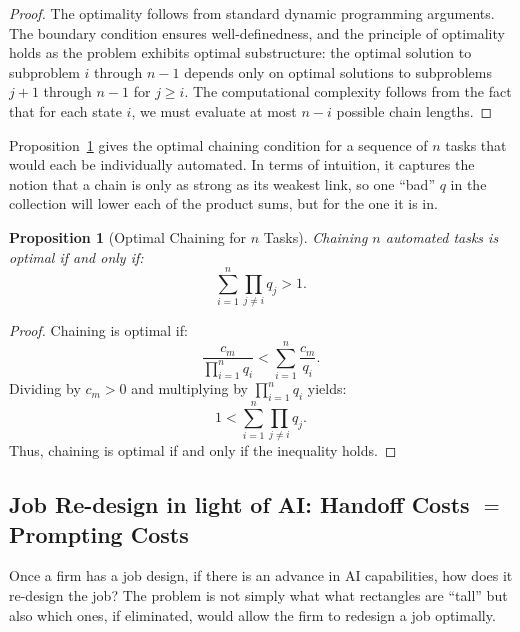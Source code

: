 \documentclass{article}
\newtheorem{proposition}[theorem]{Proposition}
\begin{document}
\begin{proof}
The optimality follows from standard dynamic programming arguments. The boundary condition ensures well-definedness, and the principle of optimality holds as the problem exhibits optimal substructure: the optimal solution to subproblem $i$ through $n-1$ depends only on optimal solutions to subproblems $j+1$ through $n-1$ for $j \geq i$. The computational complexity follows from the fact that for each state $i$, we must evaluate at most $n-i$ possible chain lengths.
\end{proof}

Proposition~\ref{prop:optimal_chaining} gives the optimal chaining condition for a sequence of $n$ tasks that would each be individually automated.
In terms of intuition, it captures the notion that a chain is only as strong as its weakest link, so one ``bad'' $q$ in the collection will lower each of the product sums, but for the one it is in. 

\begin{proposition}[Optimal Chaining for \(n\) Tasks] \label{prop:optimal_chaining}
  Chaining \(n\) automated tasks is optimal if and only if:
  \[
  \sum_{i=1}^n \prod_{j \neq i} q_j > 1.
  \]
  \end{proposition}
  
  \begin{proof}
  Chaining is optimal if:
  \[
  \frac{c_m}{\prod_{i=1}^n q_i} < \sum_{i=1}^n \frac{c_m}{q_i}.
  \]
  Dividing by \(c_m > 0\) and multiplying by \(\prod_{i=1}^n q_i\) yields:
  \[
  1 < \sum_{i=1}^n \prod_{j \neq i} q_j.
  \]
  Thus, chaining is optimal if and only if the inequality holds.
  \end{proof}

\subsection{Job Re-design in light of AI: Handoff Costs $=$ Prompting Costs}

Once a firm has a job design, if there is an advance in AI capabilities, how does it re-design the job?
The problem is not simply what what rectangles are ``tall'' but also which ones, if eliminated, would allow the firm to redesign a job optimally.
\end{document}
